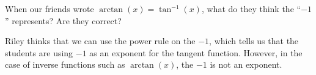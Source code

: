 \documentclass{ximera}
\begin{document}
\begin{problem}
	When our friends wrote $\arctan(x) = \tan^{-1}(x)$, what do they think the ``$-1$'' represents?  Are they correct?
	\begin{freeResponse}
		Riley thinks that we can use the power rule on the $-1$, which tells us that the students are using $-1$ as an exponent for the tangent function.  However, in the case of inverse functions such as $\arctan(x)$, the $-1$ is not an exponent.
	\end{freeResponse}
\end{problem}





\end{document}

